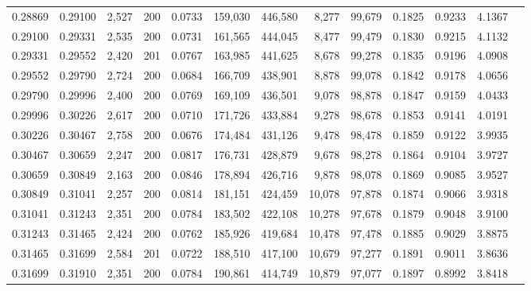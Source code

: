 \begin{tabular}{rrrrrrrrrrrrr}
0.28869 & 0.29100 & 2,527 & 200 &                                     0.0733 & 159,030 & 446,580 &   8,277 &  99,679 & 0.1825 & 0.9233 & 4.1367 \\
0.29100 & 0.29331 & 2,535 & 200 &                                     0.0731 & 161,565 & 444,045 &   8,477 &  99,479 & 0.1830 & 0.9215 & 4.1132 \\
0.29331 & 0.29552 & 2,420 & 201 &                                     0.0767 & 163,985 & 441,625 &   8,678 &  99,278 & 0.1835 & 0.9196 & 4.0908 \\
0.29552 & 0.29790 & 2,724 & 200 &                                     0.0684 & 166,709 & 438,901 &   8,878 &  99,078 & 0.1842 & 0.9178 & 4.0656 \\
0.29790 & 0.29996 & 2,400 & 200 &                                     0.0769 & 169,109 & 436,501 &   9,078 &  98,878 & 0.1847 & 0.9159 & 4.0433 \\
0.29996 & 0.30226 & 2,617 & 200 &                                     0.0710 & 171,726 & 433,884 &   9,278 &  98,678 & 0.1853 & 0.9141 & 4.0191 \\
0.30226 & 0.30467 & 2,758 & 200 &                                     0.0676 & 174,484 & 431,126 &   9,478 &  98,478 & 0.1859 & 0.9122 & 3.9935 \\
0.30467 & 0.30659 & 2,247 & 200 &                                     0.0817 & 176,731 & 428,879 &   9,678 &  98,278 & 0.1864 & 0.9104 & 3.9727 \\
0.30659 & 0.30849 & 2,163 & 200 &                                     0.0846 & 178,894 & 426,716 &   9,878 &  98,078 & 0.1869 & 0.9085 & 3.9527 \\
0.30849 & 0.31041 & 2,257 & 200 &                                     0.0814 & 181,151 & 424,459 &  10,078 &  97,878 & 0.1874 & 0.9066 & 3.9318 \\
0.31041 & 0.31243 & 2,351 & 200 &                                     0.0784 & 183,502 & 422,108 &  10,278 &  97,678 & 0.1879 & 0.9048 & 3.9100 \\
0.31243 & 0.31465 & 2,424 & 200 &                                     0.0762 & 185,926 & 419,684 &  10,478 &  97,478 & 0.1885 & 0.9029 & 3.8875 \\
0.31465 & 0.31699 & 2,584 & 201 &                                     0.0722 & 188,510 & 417,100 &  10,679 &  97,277 & 0.1891 & 0.9011 & 3.8636 \\
0.31699 & 0.31910 & 2,351 & 200 &                                     0.0784 & 190,861 & 414,749 &  10,879 &  97,077 & 0.1897 & 0.8992 & 3.8418 \\

\end{tabular}
